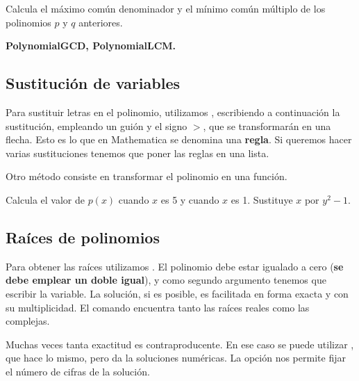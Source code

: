 \documentclass[a4paper,10pt, draft]{article}
\newcommand{\com}[1]{\textbf{\color{blue}{#1}}}
\newenvironment{ejer}{\begin{tcolorbox}[center title, title=Ejercicios,
fonttitle=\sffamily\bfseries,colback=blue!5,colframe=orange]}{\end{tcolorbox}}
\newenvironment{funciones}{\begin{tcolorbox}[center title, title=Nuevas funciones, fonttitle=\sffamily\bfseries, colback=green!5!white,colframe=red!75!black]}{\end{tcolorbox}\bigskip}
\begin{document}
\begin{ejer}

Calcula el máximo común denominador y el mínimo común múltiplo de los polinomios $p$ y $q$ anteriores.

\end{ejer} 


\begin{funciones}

\textbf{PolynomialGCD, PolynomialLCM.}


\end{funciones}

 \newpage

\subsection{Sustitución de variables}

Para sustituir letras en el polinomio, utilizamos  \com{/.}, escribiendo a continuación la sustitución, empleando un guión y el signo $>$, que se transformarán en una flecha. Esto es lo que en Mathematica se denomina una \textbf{regla}. Si queremos hacer varias sustituciones tenemos que poner las reglas en una lista. 

Otro método consiste en transformar el polinomio en una función.

\begin{ejer}

Calcula el valor de $p(x)$ cuando $x$ es 5 y cuando $x$ es 1. Sustituye $x$ por $y^2-1$.

\end{ejer}  




\newpage


\subsection{Raíces de polinomios}

Para obtener las raíces utilizamos \com{Roots[p==0,x]}. El polinomio debe estar igualado a cero (\textbf{se debe emplear un doble igual}), y como segundo argumento tenemos que escribir la variable. La solución, si es posible, es facilitada en forma exacta y con su multiplicidad. El comando encuentra tanto las raíces reales como las complejas.

Muchas veces tanta exactitud es contraproducente. En ese caso se puede utilizar \com{NRoots[p==0,x]}, que hace lo mismo, pero da la soluciones numéricas. La opción \com{PrecisionGoal} nos permite fijar el número de cifras de la solución.
\end{document}
